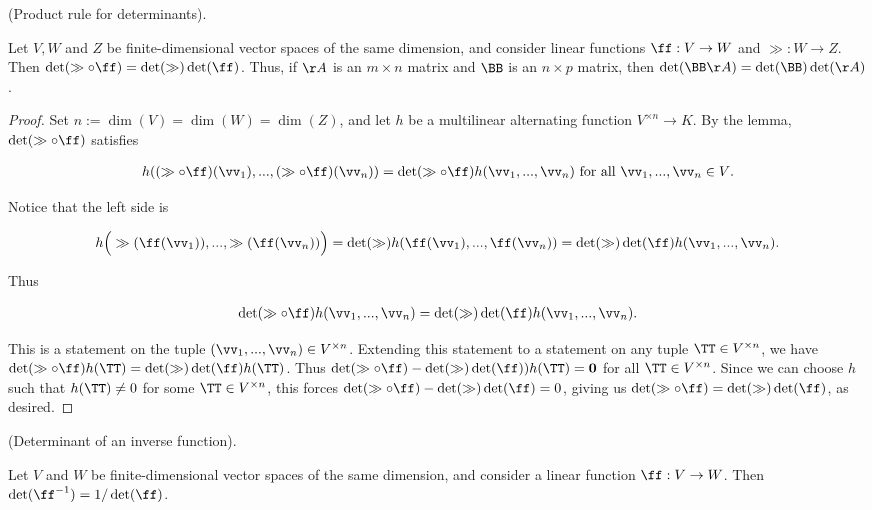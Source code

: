 \begin{theorem}
    (Product rule for determinants). 
    
    Let $V, W$ and $Z$ be finite-dimensional vector spaces of the same dimension, and consider linear functions $\ff:V \rightarrow W$ and $\gg:W \rightarrow Z$. Then $\det(\gg \circ \ff) = \det(\gg) \det(\ff)$. Thus, if $\AA$ is an $m \times n$ matrix and $\BB$ is an $n \times p$ matrix, then $\det(\BB \AA) = \det(\BB) \det(\AA)$.
\end{theorem}

\begin{proof}
   Set $n := \dim(V) = \dim(W) = \dim(Z)$, and let $h$ be a multilinear alternating function $V^{\times n} \rightarrow K$. By the lemma, $\det(\gg \circ \ff)$ satisfies
   
   \begin{align*}
       h((\gg \circ \ff)(\vv_1), ..., (\gg \circ \ff)(\vv_n)) = \det(\gg \circ \ff) h(\vv_1, ..., \vv_n) \text{ for all $\vv_1, ..., \vv_n \in V$}.
   \end{align*}
   
   Notice that the left side is
   
   \begin{align*}
       h\Big(\gg(\ff(\vv_1)), ..., \gg(\ff(\vv_n))\Big) = \det(\gg) h(\ff(\vv_1), ..., \ff(\vv_n)) =
       \det(\gg) \det(\ff) h(\vv_1, ..., \vv_n).
   \end{align*}
   
   Thus
   
   \begin{align*}
       \det(\gg \circ \ff) h(\vv_1, ..., \vv_n) = \det(\gg) \det(\ff) h(\vv_1, ..., \vv_n).
   \end{align*}
   
   This is a statement on the tuple $(\vv_1, ..., \vv_n) \in V^{\times n}$. Extending this statement to a statement on any tuple $\TT \in V^{\times n}$, we have $\det(\gg \circ \ff) h(\TT) = \det(\gg) \det(\ff) h(\TT)$. Thus ${\det(\gg \circ \ff) - \det(\gg) \det(\ff)) h(\TT) = \mathbf{0}}$ for all $\TT \in V^{\times n}$. Since we can choose $h$ such that $h(\TT) \neq 0$ for some $\TT \in V^{\times n}$, this forces $\det(\gg \circ \ff) - \det(\gg) \det(\ff) = 0$, giving us $\det(\gg \circ \ff) = \det(\gg) \det(\ff)$, as desired.
\end{proof}

\begin{theorem}
    (Determinant of an inverse function).
    
    Let $V$ and $W$ be finite-dimensional vector spaces of the same dimension, and consider a linear function $\ff:V \rightarrow W$. Then $\det(\ff^{-1}) = 1/\det(\ff)$.
\end{theorem}

